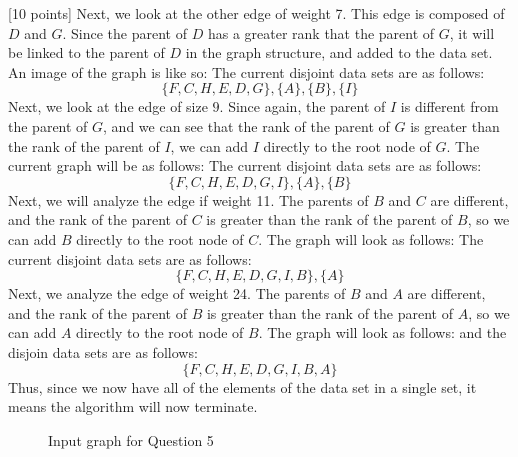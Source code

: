 \documentclass[12pt]{article}
\newcounter{ques}
\newenvironment{question}{\stepcounter{ques}{\noindent\bf Question \arabic{ques}:}}{\vspace{5mm}}
\begin{document}
\begin{question}[10 points]
Next, we look at the other edge of weight 7. This edge is composed of $D$ and $G$. Since the parent of $D$ has a greater rank that the parent of $G$, it will be linked to the parent of $D$ in the graph structure, and added to the data set. An image of the graph is like so:
The current disjoint data sets are as follows:
$$\{F,C,H,E,D,G\},\{A\},\{B\},\{I\}$$
Next, we look at the edge of size $9$. Since again, the parent of $I$ is different from the parent of $G$, and we can see that the rank of the parent of $G$ is greater than the rank of the parent of $I$, we can add $I$ directly to the root node of $G$. The current graph will be as follows:
The current disjoint data sets are as follows:
$$\{F,C,H,E,D,G,I\},\{A\},\{B\}$$
Next, we will analyze the edge if weight 11. The parents of $B$ and $C$ are different, and the rank of the parent of $C$ is greater than the rank of the parent of $B$, so we can add $B$ directly to the root node of $C$. The graph will look as follows:
The current disjoint data sets are as follows:
$$\{F,C,H,E,D,G,I,B\},\{A\}$$
Next, we analyze the edge of weight 24. The parents of $B$ and $A$ are different, and the rank of the parent of $B$ is greater than the rank of the parent of $A$, so we can add $A$ directly to the root node of $B$. The graph will look as follows:
and the disjoin data sets are as follows:
$$\{F,C,H,E,D,G,I,B,A\}$$
Thus, since we now have all of the elements of the data set in a single set, it means the algorithm will now terminate.
\end{question}


	\begin{figure}
		\centerline{}
		\caption{Input graph for Question 5}
		\label{fig:MSTgraph}
	\end{figure}
\end{document}
